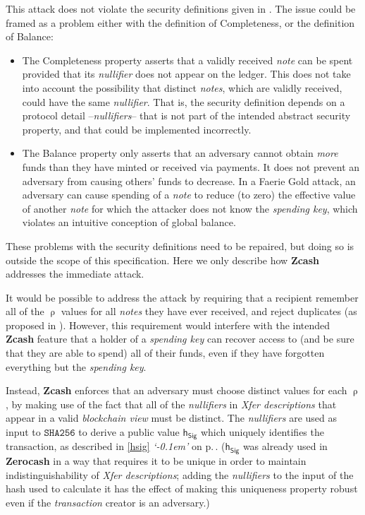 \documentclass{article}
\newcommand{\crossref}[1]{\autoref{#1} \emph{`\nameref*{#1}\kern -0.1em'} on p.\,\pageref*{#1}}
\newcommand{\term}[1]{\textsl{#1}\xspace}
\newcommand{\termbf}[1]{\textbf{#1}\xspace}
\newcommand{\Zcash}{\termbf{Zcash}}
\newcommand{\Zerocash}{\termbf{Zerocash}}
\newcommand{\coin}{\term{note}}
\newcommand{\coins}{\term{notes}}
\newcommand{\pourDescriptions}{\term{Xfer descriptions}}
\newcommand{\transaction}{\term{transaction}}
\newcommand{\blockchainview}{\term{blockchain view}}
\newcommand{\serialNumber}{\term{nullifier}}
\newcommand{\serialNumbers}{\term{nullifiers}}
\newcommand{\spendingKey}{\term{spending key}}
\newcommand{\FullHash}{\mathtt{SHA256}}
\newcommand{\CoinAddressRand}{\mathsf{\uprho}}
\newcommand{\hSig}{\mathsf{h_{Sig}}}
\begin{document}
This attack does not violate the security definitions given in
\cite{ZerocashOakland}. The issue could be framed as a problem
either with the definition of Completeness, or the definition of
Balance:

\begin{itemize}
  \item The Completeness property asserts that a validly received
\coin can be spent provided that its \serialNumber does not appear
on the ledger. This does not take into account the possibility
that distinct \coins, which are validly received, could have the
same \serialNumber. That is, the security definition depends on
a protocol detail --\serialNumbers-- that is not part of the
intended abstract security property, and that could be implemented
incorrectly.
  \item The Balance property only asserts that an adversary cannot
obtain \emph{more} funds than they have minted or received via
payments. It does not prevent an adversary from causing others'
funds to decrease. In a Faerie Gold attack, an adversary can cause
spending of a \coin to reduce (to zero) the effective value of another
\coin for which the attacker does not know the \spendingKey, which
violates an intuitive conception of global balance.
\end{itemize}

These problems with the security definitions need to be repaired,
but doing so is outside the scope of this specification. Here we
only describe how \Zcash addresses the immediate attack.

It would be possible to address the attack by requiring that a
recipient remember all of the $\CoinAddressRand$ values for all
\coins they have ever received, and reject duplicates (as proposed
in \cite{GGM2016}). However, this requirement would interfere
with the intended \Zcash feature that a holder of a \spendingKey
can recover access to (and be sure that they are able to spend) all
of their funds, even if they have forgotten everything but the
\spendingKey.

Instead, \Zcash enforces that an adversary must choose distinct values
for each $\CoinAddressRand$, by making use of the fact that all of the
\serialNumbers in \pourDescriptions that appear in a valid \blockchainview
must be distinct. The \serialNumbers are used as input to $\FullHash$
to derive a public value $\hSig$ which uniquely identifies the transaction,
as described in \crossref{hsig}. ($\hSig$ was already used in \Zerocash
in a way that requires it to be unique in order to maintain
indistinguishability of \pourDescriptions; adding the \serialNumbers
to the input of the hash used to calculate it has the effect of making
this uniqueness property robust even if the \transaction creator is an
adversary.)
\end{document}
